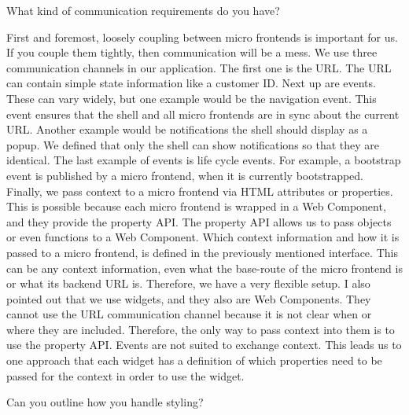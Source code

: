 \begin{description}
    \NicoVogel What kind of communication requirements do you have?

    \PirminRehm First and foremost, loosely coupling between micro frontends is important for us. If you couple them tightly, then communication will be a mess. We use three communication channels in our application. The first one is the URL. The URL can contain simple state information like a customer ID.
    Next up are events. These can vary widely, but one example would be the navigation event. This event ensures that the shell and all micro frontends are in sync about the current URL. Another example would be notifications the shell should display as a popup. We defined that only the shell can show notifications so that they are identical. The last example of events is life cycle events. For example, a bootstrap event is published by a micro frontend, when it is currently bootstrapped.
    Finally, we pass context to a micro frontend via HTML attributes or properties. This is possible because each micro frontend is wrapped in a Web Component, and they provide the property API. The property API allows us to pass objects or even functions to a Web Component. Which context information and how it is passed to a micro frontend, is defined in the previously mentioned interface. This can be any context information, even what the base-route of the micro frontend is or what its backend URL is. Therefore, we have a very flexible setup.
    I also pointed out that we use widgets, and they also are Web Components. They cannot use the URL communication channel because it is not clear when or where they are included. Therefore, the only way to pass context into them is to use the property API. Events are not suited to exchange context. This leads us to one approach that each widget has a definition of which properties need to be passed for the context in order to use the widget.

    \NicoVogel Can you outline how you handle styling?


\end{description}
